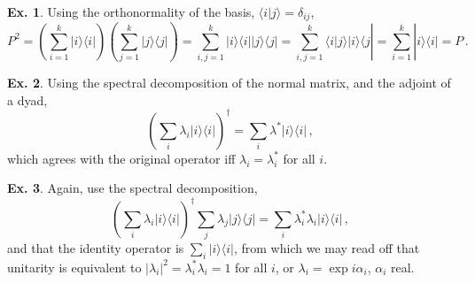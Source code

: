\documentclass[a4paper,12pt]{article}
\theoremstyle{definition}
\newtheorem{exercise}{Ex.}[section]
\begin{document}
\begin{exercise}
 Using the orthonormality of the basis, $\langle i | j\rangle=\delta_{ij}$,
 \[
  P^2 = \left(\sum_{i=1}^k |i\rangle\langle i|\right) \left(\sum_{j=1}^k |j\rangle\langle j|\right)=\sum_{i,j=1}^k |i\rangle\langle i| |j\rangle\langle j| = \sum_{i,j=1}^k \langle i|j\rangle |i\rangle \langle j| = \sum_{i=1}^k |i\rangle\langle i| = P\,.
 \]
\end{exercise}

\begin{exercise}
 Using the spectral decomposition of the normal matrix, and the adjoint of a dyad,
 \[
  \left( \sum_i \lambda_i |i\rangle\langle i|\right)^\dagger = \sum_i \lambda^* |i\rangle\langle i|\,,
 \]
 which agrees with the original operator iff $\lambda_i=\lambda_i^*$ for all $i$.
\end{exercise}

\begin{exercise}
 Again, use the spectral decomposition,
 \[
  \left( \sum_i \lambda_i |i\rangle\langle i|\right)^\dagger \sum_j \lambda_j |j\rangle\langle j| = \sum_i \lambda_i^*\lambda_i |i\rangle\langle i|\,,
 \]
 and that the identity operator is $\sum_i |i\rangle\langle i|$, from which we may read off that unitarity is equivalent to $|\lambda_i|^2 = \lambda_i^*\lambda_i = 1$ for all $i$, or $\lambda_i = \exp i\alpha_i$, $\alpha_i$ real.
\end{exercise}
\end{document}

